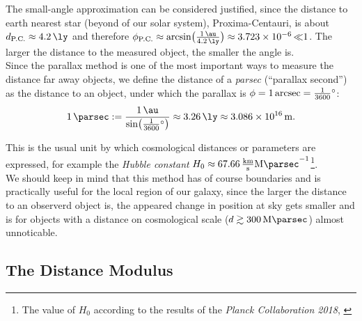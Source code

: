 The small-angle approximation can be considered justified, since the distance to earth nearest star (beyond of our solar system), Proxima-Centauri, is about $d_{\text{P.C.}} \approx \SI{4.2}{\ly}$ and therefore $\phi_{\text{P.C.}} \approx \arcsin \bigl( \frac{\SI{1}{\au}}{\SI{4.2}{\ly}} \bigr) \approx \SI{3.723e-6} \ll 1$.
The larger the distance to the measured object, the smaller the angle is. \\
\noindent Since the parallax method is one of the most important ways to measure the distance far away objects, we define the distance of a \textit{parsec} (``parallax second'') as the distance to an object, under which the parallax is $\phi = \SI{1}{\arcsec} = \frac{1}{3600} \SI{}{\degree}$:
\begin{align}
    \SI{1}{\parsec} := \frac{\SI{1}{\au}}{\sin \bigl( \frac{1}{3600} \SI{}{\degree} \bigr)} \approx \SI{3.26}{\ly} \approx \SI{3.086e16}{\meter}.
\end{align}

\noindent This is the usual unit by which cosmological distances or parameters are expressed, for example the \textit{Hubble constant} $H_{0} \approx \SI{67.66}{\frac{\kilo \meter}{\second} \mega \parsec^{-1}}$\footnote{The value of $H_{0}$ according to the results of the \textit{Planck Collaboration 2018}, \cite[Table 7]{Planck2020} }. \\ 

\noindent We should keep in mind that this method has of course boundaries and is practically useful for the local region of our galaxy, since the larger the distance to an observerd object is, the appeared change in position at sky gets smaller and is for objects with a distance on cosmological scale ($d \gtrsim \SI{300}{\mega \parsec}$) almost unnoticable. 

\subsection{The Distance Modulus}

